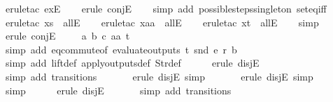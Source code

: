 \begin{isabellebody}
\ {\isacharparenleft}erule{\isacharunderscore}tac\ exE{\isacharparenright}\isanewline
\ \ \isamarkupfalse%
\ {\isacharparenleft}erule\ conjE{\isacharparenright}{\isacharplus}\isanewline
\ \ \isamarkupfalse%
\ {\isacharparenleft}simp\ add{\isacharcolon}\ possible{\isacharunderscore}steps{\isacharunderscore}singleton\ set{\isacharunderscore}eq{\isacharunderscore}iff{\isacharparenright}\isanewline
\ \ \isamarkupfalse%
\ {\isacharparenleft}erule{\isacharunderscore}tac\ x{\isacharequal}s\ \ allE{\isacharparenright}\isanewline
\ \ \isamarkupfalse%
\ {\isacharparenleft}erule{\isacharunderscore}tac\ x{\isacharequal}aa\ \ allE{\isacharparenright}\isanewline
\ \ \isamarkupfalse%
\ {\isacharparenleft}erule{\isacharunderscore}tac\ x{\isacharequal}t\ \ allE{\isacharparenright}\isanewline
\ \ \isamarkupfalse%
\ simp\isanewline
\ \ \isamarkupfalse%
\ {\isacharparenleft}erule\ conjE{\isacharparenright}{\isacharplus}\isanewline
\ \ \isamarkupfalse%
\ \ a\ b\ c\ aa\ t\isanewline
\ \ \ \ \isamarkupfalse%
\ {\isacharparenleft}simp\ add{\isacharcolon}\ eq{\isacharunderscore}commute{\isacharbrackleft}of\ {\isachardoublequoteopen}evaluate{\isacharunderscore}outputs\ t\ {\isacharparenleft}snd\ e{\isacharparenright}\ r{\isachardoublequoteclose}\ b{\isacharbrackright}{\isacharparenright}\isanewline
\ \ \ \ \isamarkupfalse%
\ {\isacharparenleft}simp\ add{\isacharcolon}\ lift{\isacharunderscore}def\ apply{\isacharunderscore}outputs{\isacharunderscore}def\ Str{\isacharunderscore}def{\isacharparenright}\isanewline
\ \ \ \ \isamarkupfalse%
\ {\isacharparenleft}erule\ disjE{\isacharparenright}\isanewline
\ \ \ \ \ \isamarkupfalse%
\ {\isacharparenleft}simp\ add{\isacharcolon}\ transitions{\isacharparenright}\isanewline
\ \ \ \ \ \isamarkupfalse%
\ {\isacharparenleft}erule\ disjE{\isacharcomma}\ simp{\isacharparenright}\isanewline
\ \ \ \ \ \isamarkupfalse%
\ {\isacharparenleft}erule\ disjE{\isacharcomma}\ simp{\isacharparenright}\isanewline
\ \ \ \ \ \isamarkupfalse%
\ simp\isanewline
\ \ \ \ \isamarkupfalse%
\ {\isacharparenleft}erule\ disjE{\isacharparenright}\isanewline
\ \ \ \ \ \isamarkupfalse%
\ {\isacharparenleft}simp\ add{\isacharcolon}\ transitions{\isacharparenright}\isanewline
\ \ \ \ \isamarkupfalse%

\end{isabellebody}
